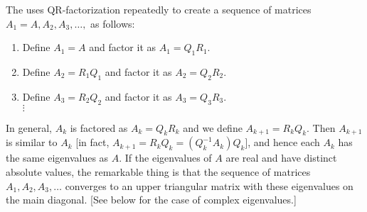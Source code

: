 \documentclass{ximera}
\begin{document}
The  uses QR-factorization repeatedly to create a sequence of matrices $A_{1} =A, A_{2}, A_{3}, \dots,$ as follows:
    
\begin{enumerate}
\item Define $A_{1} = A$ and factor it as $A_{1} = Q_{1}R_{1}$.
    
\item Define $A_{2} = R_{1}Q_{1}$ and factor it as $A_{2} = Q_{2}R_{2}$.
    
\item Define $A_{3} = R_{2}Q_{2}$ and factor it as $A_{3} = Q_{3}R_{3}$.
\\ \hspace*{4em} $\vdots$
    
    
\end{enumerate}
    
In general, $A_{k}$ is factored as $A_{k} = Q_{k}R_{k}$ and we define $A_{k + 1} = R_{k}Q_{k}$. Then $A_{k + 1}$ is similar to $A_{k}$ [in fact, $A_{k+1} = R_{k}Q_{k} = (Q_{k}^{-1}A_{k})Q_{k}$], and hence each $A_{k}$ has the same eigenvalues as $A$. If the eigenvalues of $A$ are real and have distinct absolute values, the remarkable thing is that the sequence of matrices $A_{1}, A_{2}, A_{3}, \dots$ converges to an upper triangular matrix with these eigenvalues on the main diagonal. [See below for the case of complex eigenvalues.]
    
\end{document}

